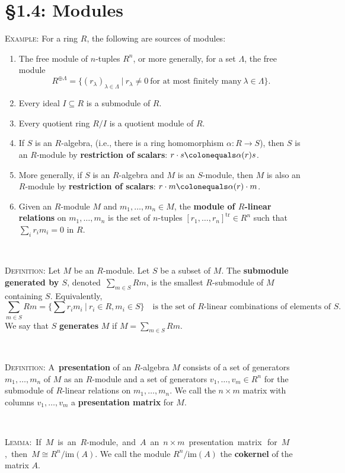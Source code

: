 \documentclass[12pt]{amsart}
\newcommand{\tr}{\mathrm{tr}}
\newcommand{\im}{\mathrm{im}}
\newcommand{\showsol}[1]{\def\displaysol{#1}}
\newcommand\ceq{\colonequals}
\begin{document}
\showsol{0}
	
	\thispagestyle{empty}
	
	\section*{\S1.4: Modules}	

\begin{framed}
\noindent \textsc{Example:} For a ring $R$, the following are sources of modules:
\begin{enumerate}
\item The free module of $n$-tuples $R^n$, or more generally, for a set $\Lambda$, the free module
\[ R^{\oplus \Lambda} = \{ (r_\lambda)_{\lambda\in\Lambda} \ | \ r_\lambda\neq 0 \ \text{for at most finitely many} \ \lambda\in\Lambda\}.\]
\item Every ideal $I\subseteq R$ is a submodule of $R$.
\item Every quotient ring $R/I$ is a quotient module of $R$.
\item If $S$ is an $R$-algebra, (i.e., there is a ring homomorphism $\alpha: R\to S$), then $S$ is an $R$-module by \textbf{restriction of scalars}:
$r \cdot s \ceq \alpha(r) s$.
\item More generally, if $S$ is an $R$-algebra and $M$ is an $S$-module, then $M$ is also an $R$-module by \textbf{restriction of scalars}: $r \cdot m \ceq \alpha(r) \cdot m$.
\item Given an $R$-module $M$ and $m_1,\dots,m_n\in M$, the \textbf{module of $R$-linear relations} on $m_1,\dots,m_n$ is the set of $n$-tuples $[r_1,\dots,r_n]^\tr \in R^n$ such that $\sum_i r_i m_i=0$ in $R$.
\end{enumerate}
 
 \
 
 \noindent \textsc{Definition:} Let $M$ be an $R$-module. Let $S$ be a subset of $M$. The \textbf{submodule generated by $S$}, denoted\footnotemark \, $\sum_{m\in S} Rm$, is the smallest $R$-submodule of $M$ containing $S$. Equivalently, 
\[ \sum_{m\in S} Rm = \big\{ \sum r_i m_i \ | \ r_i \in R, m_i \in S\big\} \quad \text{is the set of $R$-linear combinations of elements of $S$.}\]
We say that $S$ \textbf{generates} $M$ if $M=\sum_{m\in S} Rm$.

\

\noindent \textsc{Definition:} A\footnotemark\ \textbf{presentation} of an $R$-algebra $M$ consists of a set of generators $m_1,\dots,m_n$ of $M$ as an $R$-module and a set of generators $v_1,\dots, v_m\in R^n$ for the submodule of $R$-linear relations on $m_1,\dots,m_n$. We call the $n \times m$ matrix with columns $v_1,\dots, v_m$ a \textbf{presentation matrix} for $M$. 

\

\noindent \textsc{Lemma:}\mbox{ If $M$ is an $R$-module, and $A$ an $n\times m$ presentation matrix\footnotemark\, for $M$,~then~${M\cong R^n / \im(A)}$.} We call the module $R^n / \im(A)$ the \textbf{cokernel} of the matrix $A$.


 \end{framed}
\end{document}
